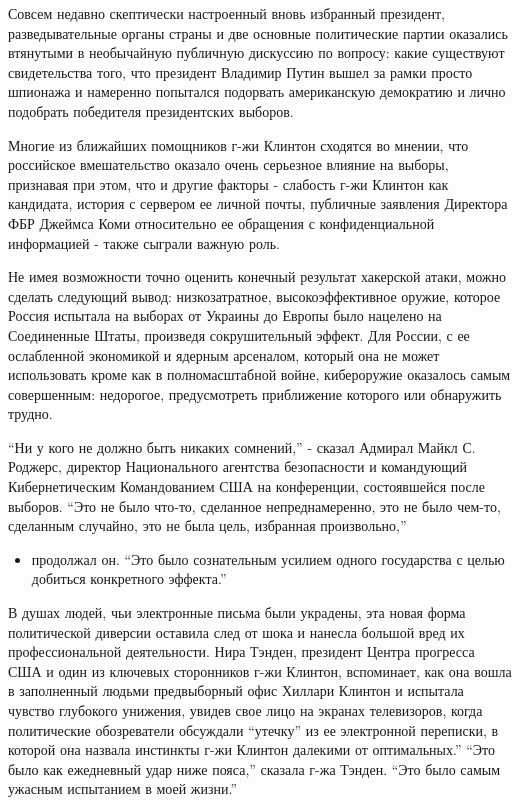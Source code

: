 Совсем недавно скептически настроенный вновь избранный президент,
разведывательные органы страны и две основные политические партии
оказались втянутыми в необычайную публичную дискуссию по вопросу: какие
существуют свидетельства того, что президент Владимир Путин вышел за
рамки просто шпионажа и намеренно попытался подорвать американскую
демократию и лично подобрать победителя президентских выборов.

Многие из ближайших помощников г-жи Клинтон сходятся во мнении, что
российское вмешательство оказало очень серьезное влияние на выборы,
признавая при этом, что и другие факторы - слабость г-жи Клинтон как
кандидата, история с сервером ее личной почты, публичные заявления
Директора ФБР Джеймса Коми относительно ее обращения с конфиденциальной
информацией - также сыграли важную роль.

Не имея возможности точно оценить конечный результат хакерской атаки,
можно сделать следующий вывод: низкозатратное, высокоэффективное оружие,
которое Россия испытала на выборах от Украины до Европы было нацелено на
Соединенные Штаты, произведя сокрушительный эффект. Для России, с ее
ослабленной экономикой и ядерным арсеналом, который она не может
использовать кроме как в полномасштабной войне, кибероружие оказалось
самым совершенным: недорогое, предусмотреть приближение которого или
обнаружить трудно.

``Ни у кого не должно быть никаких сомнений,'' - сказал Адмирал Майкл С.
Роджерс, директор Национального агентства безопасности и командующий
Кибернетическим Командованием США на конференции, состоявшейся после
выборов. ``Это не было что-то, сделанное непреднамеренно, это не было
чем-то, сделанным случайно, это не была цель, избранная произвольно,''

\begin{itemize}
\tightlist
\item
  продолжал он. ``Это было сознательным усилием одного государства с
  целью добиться конкретного эффекта.''
\end{itemize}

В душах людей, чьи электронные письма были украдены, эта новая форма
политической диверсии оставила след от шока и нанесла большой вред их
профессиональной деятельности. Нира Тэнден, президент Центра прогресса
США и один из ключевых сторонников г-жи Клинтон, вспоминает, как она
вошла в заполненный людьми предвыборный офис Хиллари Клинтон и испытала
чувство глубокого унижения, увидев свое лицо на экранах телевизоров,
когда политические обозреватели обсуждали ``утечку'' из ее электронной
переписки, в которой она назвала инстинкты г-жи Клинтон далекими от
оптимальных.'' ``Это было как ежедневный удар ниже пояса,'' сказала г-жа
Тэнден. ``Это было самым ужасным испытанием в моей жизни.''

